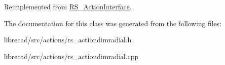 Reimplemented from \hyperlink{classRS__ActionInterface_a16c2d17c24c1131d88360abbdfcc1d63}{R\-S\-\_\-\-Action\-Interface}.



The documentation for this class was generated from the following files\-:\begin{DoxyCompactItemize}
\item 
librecad/src/actions/rs\-\_\-actiondimradial.\-h\item 
librecad/src/actions/rs\-\_\-actiondimradial.\-cpp\end{DoxyCompactItemize}

